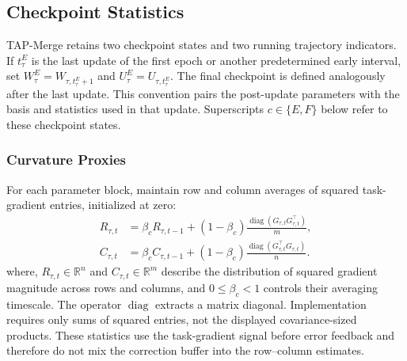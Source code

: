 \documentclass[fleqn,10pt]{wlscirep}
\begin{document}
\subsection{Checkpoint Statistics}
\label{subsec:early_trajectory_preservation}

TAP-Merge retains two checkpoint states and two running trajectory indicators. If $t_{\tau}^{E}$ is the last update of the first epoch or another predetermined early interval, set $W_{\tau}^{E}=W_{\tau,t_{\tau}^{E}+1}$ and $U_{\tau}^{E}=U_{\tau,t_{\tau}^{E}}$. The final checkpoint is defined analogously after the last update. This convention pairs the post-update parameters with the basis and statistics used in that update. Superscripts $c\in\{E,F\}$ below refer to these checkpoint states.

\subsubsection{Curvature Proxies}
\label{subsubsec:curvature_saliency}

For each parameter block, maintain row and column averages of squared task-gradient entries, initialized at zero:
\begin{equation}
\begin{aligned}
R_{\tau,t}
&=\beta_cR_{\tau,t-1}
 +(1-\beta_c)\frac{\operatorname{diag}(G_{\tau,t}G_{\tau,t}^{\top})}{m},\\
C_{\tau,t}
&=\beta_cC_{\tau,t-1}
 +(1-\beta_c)\frac{\operatorname{diag}(G_{\tau,t}^{\top}G_{\tau,t})}{n}.
\end{aligned}
\label{eq:row_curvature}
\end{equation}
where, $R_{\tau,t}\in\mathbb{R}^{n}$ and $C_{\tau,t}\in\mathbb{R}^{m}$ describe the distribution of squared gradient magnitude across rows and columns, and $0\leq\beta_c<1$ controls their averaging timescale. The operator $\operatorname{diag}$ extracts a matrix diagonal. Implementation requires only sums of squared entries, not the displayed covariance-sized products. These statistics use the task-gradient signal before error feedback and therefore do not mix the correction buffer into the row--column estimates.
\end{document}
